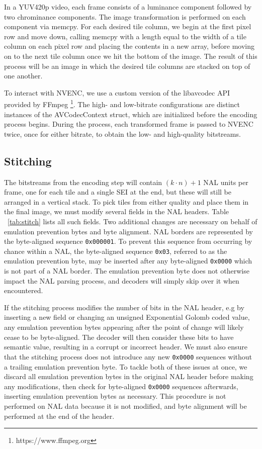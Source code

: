 In a YUV420p video, each frame consists of a luminance component followed by two chrominance components. The image transformation is performed on each component via memcpy. For each desired tile column, we begin at the first pixel row and move down, calling memcpy with a length equal to the width of a tile column on each pixel row and placing the contents in a new array, before moving on to the next tile column once we hit the bottom of the image. The result of this process will be an image in which the desired tile columns are stacked on top of one another.

To interact with NVENC, we use a custom version of the libavcodec API provided by FFmpeg \footnote{https://www.ffmpeg.org}. The high- and low-bitrate configurations are distinct instances of the AVCodecContext struct, which are initialized before the encoding process begins. During the process, each transformed frame is passed to NVENC twice, once for either bitrate, to obtain the low- and high-quality bitstreams.

\subsection{Stitching}

The bitstreams from the encoding step will contain $(k \cdot n)+1$ NAL units per frame, one for each tile and a single SEI at the end, but these will still be arranged in a vertical stack. To pick tiles from either quality and place them in the final image, we must modify several fields in the NAL headers. Table ~\ref{tab:stitch} lists all such fields. Two additional changes are necessary on behalf of emulation prevention bytes and byte alignment. NAL borders are represented by the byte-aligned sequence \texttt{0x000001}. To prevent this sequence from occurring by chance within a NAL, the byte-aligned sequence \texttt{0x03}, referred to as the emulation prevention byte, may be inserted after any byte-aligned \texttt{0x0000} which is not part of a NAL border. The emulation prevention byte does not otherwise impact the NAL parsing process, and decoders will simply skip over it when encountered. 

If the stitching process modifies the number of bits in the NAL header, e.g by inserting a new field or changing an unsigned Exponential Golomb coded value, any emulation prevention bytes appearing after the point of change will likely cease to be byte-aligned. The decoder will then consider these bits to have semantic value, resulting in a corrupt or incorrect header. We must also ensure that the stitching process does not introduce any new \texttt{0x0000} sequences without a trailing emulation prevention byte. To tackle both of these issues at once, we discard all emulation prevention bytes in the original NAL header before making any modifications, then check for byte-aligned \texttt{0x0000} sequences afterwards, inserting emulation prevention bytes as necessary. This procedure is not performed on NAL data because it is not modified, and byte alignment will be performed at the end of the header.

